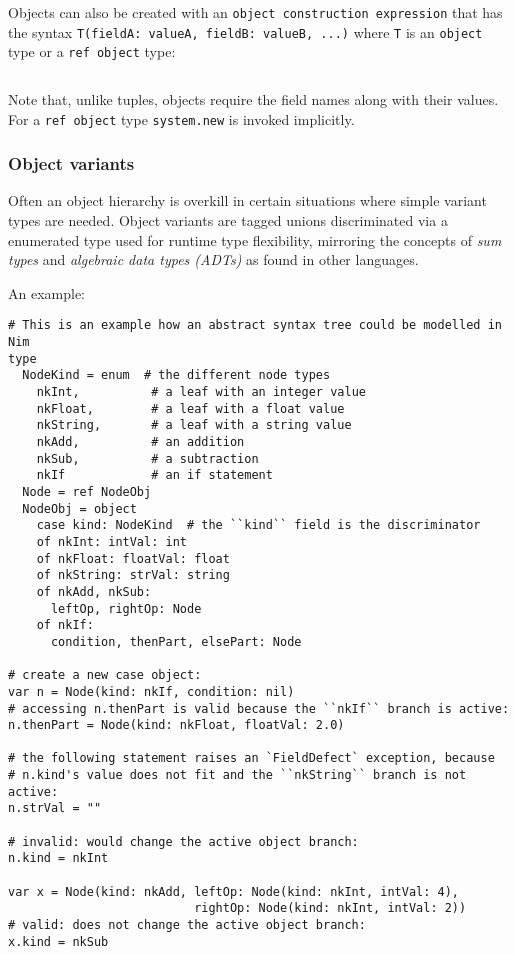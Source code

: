 Objects can also be created with an
\texttt{object\ construction\ expression} that has the syntax
\texttt{T(fieldA:\ valueA,\ fieldB:\ valueB,\ ...)} where \texttt{T} is
an \texttt{object} type or a \texttt{ref\ object} type:

\begin{verbatim}
\end{verbatim}

Note that, unlike tuples, objects require the field names along with
their values. For a \texttt{ref\ object} type \texttt{system.new} is
invoked implicitly.

\hypertarget{object-variants}{%
\subsubsection{Object variants}\label{object-variants}}

Often an object hierarchy is overkill in certain situations where simple
variant types are needed. Object variants are tagged unions
discriminated via a enumerated type used for runtime type flexibility,
mirroring the concepts of \emph{sum types} and \emph{algebraic data
types (ADTs)} as found in other languages.

An example:

\begin{verbatim}
# This is an example how an abstract syntax tree could be modelled in Nim
type
  NodeKind = enum  # the different node types
    nkInt,          # a leaf with an integer value
    nkFloat,        # a leaf with a float value
    nkString,       # a leaf with a string value
    nkAdd,          # an addition
    nkSub,          # a subtraction
    nkIf            # an if statement
  Node = ref NodeObj
  NodeObj = object
    case kind: NodeKind  # the ``kind`` field is the discriminator
    of nkInt: intVal: int
    of nkFloat: floatVal: float
    of nkString: strVal: string
    of nkAdd, nkSub:
      leftOp, rightOp: Node
    of nkIf:
      condition, thenPart, elsePart: Node

# create a new case object:
var n = Node(kind: nkIf, condition: nil)
# accessing n.thenPart is valid because the ``nkIf`` branch is active:
n.thenPart = Node(kind: nkFloat, floatVal: 2.0)

# the following statement raises an `FieldDefect` exception, because
# n.kind's value does not fit and the ``nkString`` branch is not active:
n.strVal = ""

# invalid: would change the active object branch:
n.kind = nkInt

var x = Node(kind: nkAdd, leftOp: Node(kind: nkInt, intVal: 4),
                          rightOp: Node(kind: nkInt, intVal: 2))
# valid: does not change the active object branch:
x.kind = nkSub
\end{verbatim}

